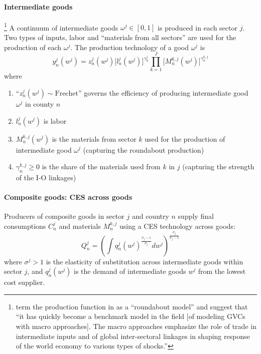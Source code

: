 \paragraph{Intermediate goods}%
\footnote{
    \cite{Antras:2022} term the production function in \cite{Caliendo:2015} as a ``roundabout model''
    and suggest that ``it has quickly become a benchmark model in the field [of modeling GVCs with macro approaches].
    The macro approaches emphasize the role of trade in intermediate inputs and of global inter-sectoral linkages 
    in shaping response of the world economy to various types of shocks.''
}
A continuum of intermediate goods $\omega^j \in [0, 1]$ is produced in each sector $j$.
Two types of inputs, labor and ``materials from all sectors'' are used for the 
production of each $\omega^j$.
The production technology of a good $\omega^j$ is 
\begin{equation}
    y_n^j(w^j) = z_n^j(w^j)\bigg[ l_n^j(w^j) \bigg]^{\gamma_n^j} \prod_{k=1}^J \bigg[ M_n^{k,j}(w^j) \bigg]^{\gamma_n^{k,j}}
\end{equation}
where
\begin{enumerate}
    \item ``$z_n^j(w^j) \sim \text{Frechet}$'' governs the efficiency of producing intermediate good $\omega^j$ in county $n$
    \item $l_n^j(w^j)$ is labor
    \item $M_n^{k,j}(w^j)$ is the materials from sector $k$ used for the production of intermediate good $\omega^j$ (capturing the roundabout production)
    \item $\gamma_n^{k,j} \geq 0$ is the share of the materials used from $k$ in $j$ (capturing the strength of the I-O linkages)
\end{enumerate}

\paragraph{Composite goods: CES across goods}%
Producers of composite goods in sector $j$ and country $n$ supply final consumptions $C_n^j$ and materials $M_n^{k,j}$
using a CES technology across goods:
\begin{equation}
    Q_n^j = \left(\int q_n^j (w^j)^{\frac{\sigma_j-1}{\sigma_j}} d w^j \right)^{\frac{\sigma_j}{\sigma_j - 1}}
\end{equation}
where $\sigma^j > 1$ is the elasticity of substitution across intermediate goods within sector $j$,
and $q_n^j (w^j)$ is the demand of intermediate goods $w^j$ from the lowest cost supplier.

